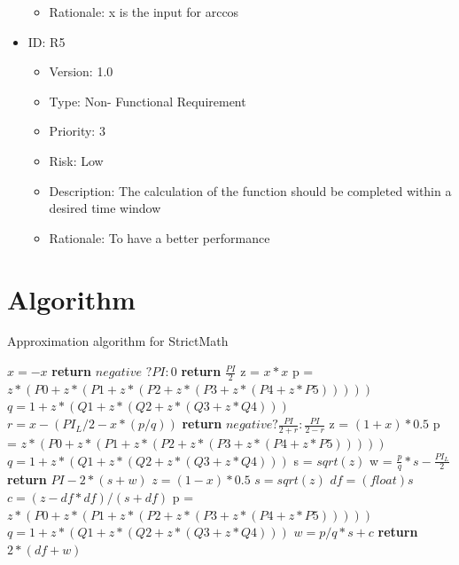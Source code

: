 \documentclass[12pt]{report}
\begin{document}
\begin{itemize}
\begin{itemize}
\item Rationale: x is the input for arccos
\end{itemize}
\item ID: R5
\begin{itemize}
\item Version:  1.0
\item Type: Non- Functional Requirement
\item Priority: 3
\item Risk: Low
\item Description: The calculation of the function should be completed within a desired time window
\item Rationale: To have a better performance
\end{itemize}
\end{itemize}


 
\newpage
\section{Algorithm}
\begin{algorithm}
\caption{Approximation algorithm for StrictMath}
\begin{algorithmic}[1]
  \State $x = -x$
\EndIf
{}
  \State \textbf{return} $negative$ $? PI : 0$
\EndIf
{}
  \State \textbf{return} $\frac{PI}{2}$
  \EndIf
\State z = $ x * x $
\State p = $ z * (P0 + z * (P1 + z * (P2 + z * (P3 + z * (P4 + z * P5)))))$
\State $q = 1 + z * (Q1 + z * (Q2 + z * (Q3 + z * Q4)))$
\State $r = x - (PI_L / 2 - x * (p / q))$
  \State \textbf{return} $negative ? \frac {PI}{2 + r} :\frac {PI}{2 - r}$
\EndIf
{}
\State z = $(1 + x) * 0.5$
\State p = $ z * (P0 + z * (P1 + z * (P2 + z * (P3 + z * (P4 + z * P5)))))$
\State $q = 1 + z * (Q1 + z * (Q2 + z * (Q3 + z * Q4)))$
\State s = $sqrt(z)$
\State w = $\frac{p }{ q }* s - \frac{PI_L}{2}$
  \State \textbf{return} $PI - 2 * (s + w)$
\State $z = (1 - x) * 0.5$
\State $s = sqrt(z)$
\State $df = (float) s$
\State $c = (z - df * df) / (s + df)$
\State p = $ z * (P0 + z * (P1 + z * (P2 + z * (P3 + z * (P4 + z * P5)))))$
\State $q = 1 + z * (Q1 + z * (Q2 + z * (Q3 + z * Q4)))$
\State $w = p / q * s + c$
\State \textbf{return} $2 * (df + w)$
\EndIf

\end{algorithmic}
\end{algorithm}
\end{document}

